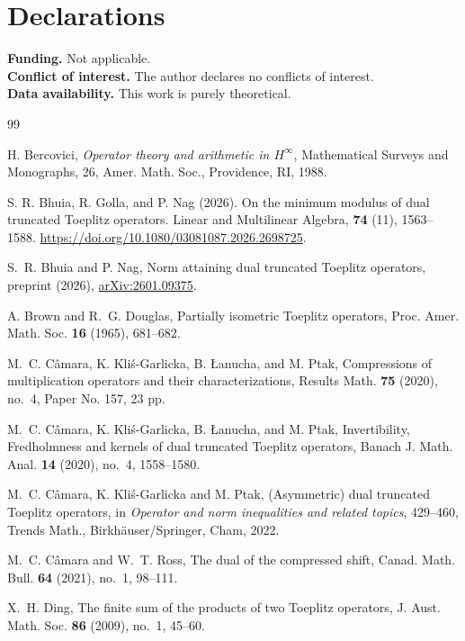 \documentclass[12pt]{amsart}
\theoremstyle{definition}
\theoremstyle{remark}
\numberwithin{equation}{section}
\begin{document}
\section*{Declarations}
\noindent\textbf{Funding.} Not applicable.\\
\noindent\textbf{Conflict of interest.} The author declares no conflicts of interest.\\
\noindent\textbf{Data availability.} This work is purely theoretical.

\begin{thebibliography}{99}

H. Bercovici, {\it Operator theory and arithmetic in $H^\infty$}, Mathematical Surveys and Monographs, 26, Amer. Math. Soc., Providence, RI, 1988.

S. R. Bhuia, R. Golla, and P. Nag (2026). On the minimum modulus of dual truncated Toeplitz operators. Linear and Multilinear Algebra, \textbf{74} (11), 1563–1588. \href{ https://doi.org/10.1080/03081087.2026.2698725}{ https://doi.org/10.1080/03081087.2026.2698725}.

S.~R. Bhuia and P. Nag, Norm attaining dual truncated Toeplitz operators, preprint (2026), \href{https://arxiv.org/abs/2601.09375}{arXiv:2601.09375}.



A. Brown and R.~G. Douglas, Partially isometric Toeplitz operators, Proc. Amer. Math. Soc. {\bf 16} (1965), 681--682.

M.~C. C\^amara, K. Kli\'s-Garlicka, B. \L anucha, and M. Ptak, Compressions of multiplication operators and their characterizations, Results Math. {\bf 75} (2020), no.~4, Paper No. 157, 23 pp.

M.~C. C\^amara, K. Kli\'s-Garlicka, B. \L anucha, and M. Ptak, Invertibility, Fredholmness and kernels of dual truncated Toeplitz operators, Banach J. Math. Anal. {\bf 14} (2020), no.~4, 1558--1580.

M.~C. C\^amara, K. Kli\'s-Garlicka and M. Ptak, (Asymmetric) dual truncated Toeplitz operators, in {\it Operator and norm inequalities and related topics}, 429--460, Trends Math., Birkh\"auser/Springer, Cham, 2022.

M.~C. C\^amara and W.~T. Ross, The dual of the compressed shift, Canad. Math. Bull. {\bf 64} (2021), no.~1, 98--111.

X.~H. Ding, The finite sum of the products of two Toeplitz operators, J. Aust. Math. Soc. {\bf 86} (2009), no.~1, 45--60.


\end{thebibliography}
\end{document}
